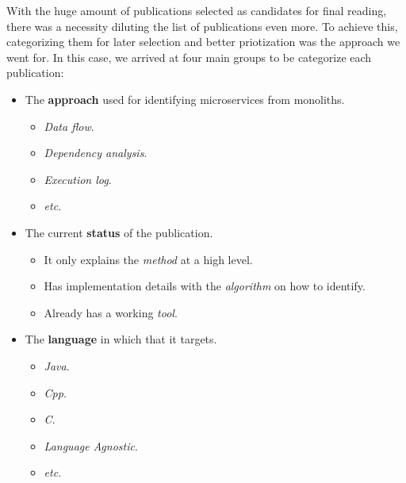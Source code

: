 \documentclass[conference]{IEEEtran}
\begin{document}
With the huge amount of publications selected as candidates for final reading,
there was a necessity diluting the list of publications even more. To achieve
this, categorizing them for later selection and better priotization was the
approach we went for. In this case, we arrived at four main groups to be
categorize each publication:

\begin{itemize}
  \item The \textbf{approach} used for identifying microservices from monoliths.
  \begin{itemize}
    \item \textit{Data flow}.
    \item \textit{Dependency analysis}.
    \item \textit{Execution log}.
    \item \textit{etc}.
  \end{itemize}
  \item The current \textbf{status} of the publication.
  \begin{itemize}
    \item It only explains the \textit{method} at a high level.
    \item Has implementation details with the \textit{algorithm} on how to identify.
    \item Already has a working \textit{tool}.
  \end{itemize}
  \item The \textbf{language} in which that it targets.
  \begin{itemize}
    \item \textit{Java}.
    \item \textit{Cpp}.
    \item \textit{C}.
    \item \textit{Language Agnostic}.
    \item \textit{etc}.
  \end{itemize}
\end{itemize}

\end{document}
